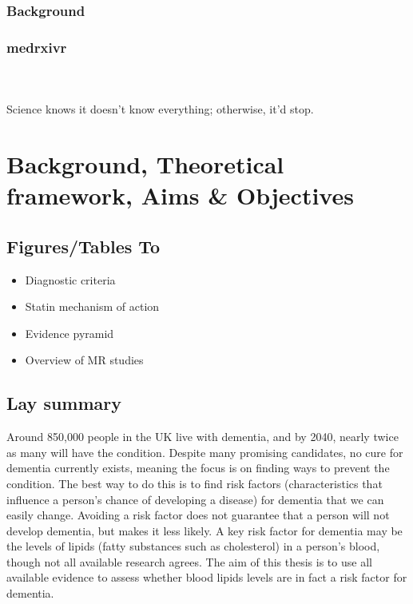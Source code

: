 \documentclass[a4paper, twoside]{templates/ociamthesis}
\providecommand{\tightlist}{%
  \setlength{\itemsep}{0pt}\setlength{\parskip}{0pt}}
\begin{document}
\hypertarget{background}{%
\subsection{Background}\label{background}}

\hypertarget{medrxivr}{%
\subsection{medrxivr}\label{medrxivr}}

\hypertarget{section}{%
\subsection{}\label{section}}

~

\begin{savequote}
Science knows it doesn't know everything; otherwise, it'd stop.
\end{savequote}



\hypertarget{background-heading}{%
\chapter{Background, Theoretical framework, Aims \& Objectives}\label{background-heading}}

\minitoc 

\hypertarget{figurestables-to}{%
\section{Figures/Tables To}\label{figurestables-to}}

\begin{itemize}
\tightlist
\item
  Diagnostic criteria
\item
  Statin mechanism of action
\item
  Evidence pyramid
\item
  Overview of MR studies
\end{itemize}

\hypertarget{lay-summary}{%
\section{Lay summary}\label{lay-summary}}

Around 850,000 people in the UK live with dementia, and by 2040, nearly twice as many will have the condition. Despite many promising candidates, no cure for dementia currently exists, meaning the focus is on finding ways to prevent the condition. The best way to do this is to find risk factors (characteristics that influence a person's chance of developing a disease) for dementia that we can easily change. Avoiding a risk factor does not guarantee that a person will not develop dementia, but makes it less likely. A key risk factor for dementia may be the levels of lipids (fatty substances such as cholesterol) in a person's blood, though not all available research agrees. The aim of this thesis is to use all available evidence to assess whether blood lipids levels are in fact a risk factor for dementia.
\end{document}

